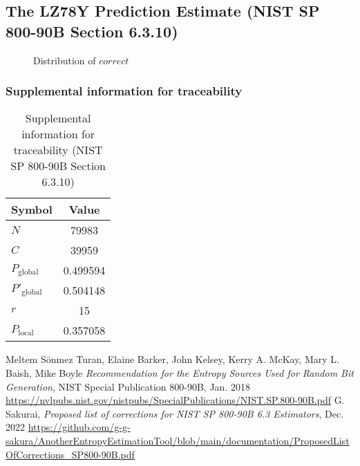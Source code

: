 \documentclass[a3paper,xelatex,english]{bxjsarticle}
\begin{document}
\subsection{The LZ78Y Prediction Estimate (NIST SP 800-90B Section 6.3.10)}
\begin{figure}[htbp]
\centering

\caption{Distribution of $correct$}
\end{figure}
\subsubsection{Supplemental information for traceability}
\renewcommand{\arraystretch}{1.8}
\begin{table}[h]
\caption{Supplemental information for traceability (NIST SP 800-90B Section 6.3.10)}
\begin{center}
\begin{tabular}{|l|c|}
\hline 
\rowcolor{anotherlightblue} %
Symbol				& Value \\ \hline 
$N$				& 79983\\ \hline 
$C$				& 39959\\ \hline 
$P_{\textrm{global}}$				& 0.499594\\ \hline 
$P'_{\textrm{global}}$			& 0.504148\\ \hline 
$r$				& 15\\ \hline 
$P_{\textrm{local}}$ 			& 0.357058\\ \hline
\end{tabular}
\end{center}
\end{table}
\renewcommand{\arraystretch}{1.4}
\begin{thebibliography}{99}
Meltem S\"{o}nmez Turan,
Elaine Barker,
John Kelsey,
Kerry A. McKay,
Mary L. Baish,
Mike Boyle
\textit{Recommendation for the Entropy Sources Used for Random Bit Generation},
NIST Special Publication 800-90B, Jan. 2018 
\url{https://nvlpubs.nist.gov/nistpubs/SpecialPublications/NIST.SP.800-90B.pdf}
G. Sakurai, \textit{Proposed list of corrections for NIST SP 800-90B 6.3 Estimators}, Dec. 2022 
\url{https://github.com/g-g-sakura/AnotherEntropyEstimationTool/blob/main/documentation/ProposedListOfCorrections_SP800-90B.pdf}
\end{thebibliography}
\end{document}
